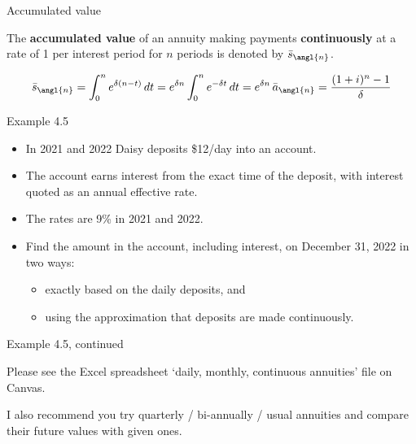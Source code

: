 \documentclass{beamer}
\begin{document}
\begin{frame}{Accumulated value}

The \textbf{accumulated value} of an annuity making payments \textbf{continuously} at a rate of 1 per interest period for $n$ periods is denoted by $\bar{s}_{\angl{n}}$.

\begin{center}
\end{center}

\[
\bar{s}_{\angl{n}} = \int_0^n e^{\delta(n-t)}\,dt = e^{\delta n}\int_0^n e^{-\delta t}\,dt = e^{\delta n}\,\bar{a}_{\angl{n}} = \frac{(1+i)^n - 1}{\delta}
\]

\vfill
\end{frame}

\begin{frame}{Example 4.5}

\begin{itemize}
\item In 2021 and 2022 Daisy deposits \$12/day into an account.
\item The account earns interest from the exact time of the deposit, with interest quoted as an annual effective rate.
\item The rates are 9\% in 2021 and 2022.
\item Find the amount in the account, including interest, on December 31, 2022 in two ways:
\begin{itemize}
\item[(a)] exactly based on the daily deposits, and
\item[(b)] using the approximation that deposits are made continuously.
\end{itemize}
\end{itemize}

\vfill
\end{frame}

\begin{frame}{Example 4.5, continued}

Please see the Excel spreadsheet `daily, monthly, continuous annuities' file on Canvas.

\bigskip
I also recommend you try quarterly / bi-annually / usual annuities and compare their future values with given ones.

\end{frame}
\end{document}
